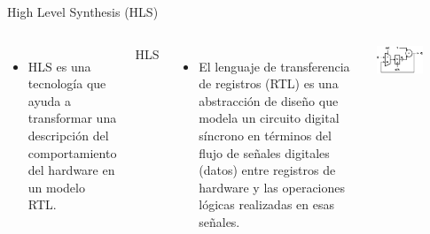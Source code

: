 \begin{frame}{High Level Synthesis (HLS)}
\begin{columns}
    \begin{itemize}
        \item HLS es una tecnología que ayuda a transformar una descripción del comportamiento del hardware en un modelo RTL.	 
    \end{itemize}
\begin{block}{HLS}

			
\end{block}
	\begin{itemize}
        \item El lenguaje de transferencia de registros (RTL) es una abstracción de diseño que modela un circuito digital síncrono en términos del flujo de señales digitales (datos) entre registros de hardware y las operaciones lógicas realizadas en esas señales.	
	\end{itemize}
        \begin{center}
        \includegraphics[width=0.6\textwidth]{Figs/Registro_8Bits}
        \end{center}		
\end{columns}
\end{frame}

